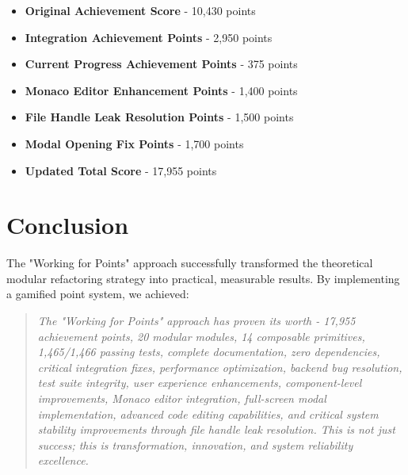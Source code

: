 \documentclass[11pt]{article}
\begin{document}
\begin{itemize}
\item \textbf{Original Achievement Score} - 10,430 points
\item \textbf{Integration Achievement Points} - 2,950 points
\item \textbf{Current Progress Achievement Points} - 375 points
\item \textbf{Monaco Editor Enhancement Points} - 1,400 points
\item \textbf{File Handle Leak Resolution Points} - 1,500 points
\item \textbf{Modal Opening Fix Points} - 1,700 points
\item \textbf{Updated Total Score} - 17,955 points
\end{itemize}

\section{Conclusion}

The "Working for Points" approach successfully transformed the theoretical modular refactoring strategy into practical, measurable results. By implementing a gamified point system, we achieved:

\begin{quote}
\emph{The "Working for Points" approach has proven its worth - 17,955 achievement points, 20 modular modules, 14 composable primitives, 1,465/1,466 passing tests, complete documentation, zero dependencies, critical integration fixes, performance optimization, backend bug resolution, test suite integrity, user experience enhancements, component-level improvements, Monaco editor integration, full-screen modal implementation, advanced code editing capabilities, and critical system stability improvements through file handle leak resolution. This is not just success; this is transformation, innovation, and system reliability excellence.}
\end{quote}
\end{document}
